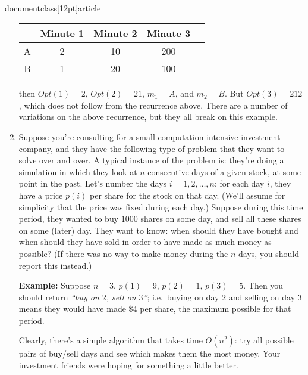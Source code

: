 \\documentclass[12pt]{article}
\begin{document}
\begin{enumerate}
{\begin{table}[h]
\begin{center}
\begin{tabular}{|c||c|c|c|c|}
\hline & Minute 1 & Minute 2 & Minute 3 \\ \hline
A & 2 & 10 & 200   \\ \hline
B & 1 & 20 & 100   \\ \hline
\end{tabular}
\end{center}
\end{table}

\noindent then $Opt(1) = 2$, $Opt(2) = 21$,
$m_1 = A$, and $m_2 = B$.
But $Opt(3) = 212$, which does not follow
from the recurrence above.
There are a number of variations on the above recurrence,
but they all break on this example.

}



\item

Suppose you're consulting for a small computation-intensive
investment company, and they have the following type
of problem that they want to solve over and over.
A typical instance of the problem is: they're doing a
simulation in which they look at $n$ consecutive days of a given stock,
at some point in the past.
Let's number the days $i = 1, 2, \ldots, n$;
for each day $i$, they have a price $p(i)$ per share for the stock on that day.
(We'll assume for simplicity that the price was fixed during each day.)
Suppose during this time period, they wanted to buy $1000$ shares
on some day, and sell all these shares on some (later) day.
They want to know:
when should they have bought and when should they have sold
in order to have made as much money as possible?
(If there was no way to make money during the
$n$ days, you should report this instead.)

{\bf Example:} Suppose $n = 3$, $p(1) = 9$, $p(2) = 1$, $p(3) = 5$.
Then you should return {\em ``buy on $2$, sell on $3$''};
i.e.~buying on day $2$
and selling on day $3$ means they would have made
$\$4$ per share, the maximum possible for that period.

Clearly, there's a simple algorithm that takes time $O(n^2)$:
try all possible pairs of buy/sell days and see which
makes them the most money.
Your investment friends were hoping for something a little better.


\end{enumerate}
\end{document}

